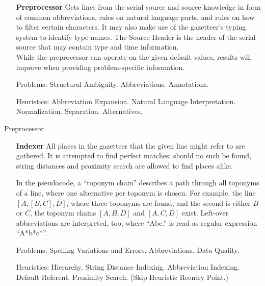 \documentclass[11pt]{article}
\begin{document}
\newpage

\begin{itemize}
\item[\textbf{Preprocessor}] Gets lines from the serial source and source knowledge in form of common abbreviations, rules on natural language parts, and rules on how to filter certain characters. It may also make use of the gazetteer's typing system to identify type names. The Source Header is the header of the serial source that may contain type and time information.\\
While the preprocessor can operate on the given default values, results will improve when providing problem-specific information.
\item[Problems:] Structural Ambiguity. Abbreviations. Annotations.
\item[Heuristics:] Abbreviation Expansion. Natural Language Interpretation. Normalization. Separation. Alternatives.
\end{itemize}

\begin{algorithm}[H]

\caption{Preprocessor}
\end{algorithm}

\newpage

\begin{itemize}
\item[\textbf{Indexer}] All places in the gazetteer that the given line might refer to are gathered. It is attempted to find perfect matches; should no such be found, string distances and proximity search are allowed to find places alike.

In the pseudocode, a ``toponym chain'' describes a path through all toponyms of a line, where one alternative per toponym is chosen. For example, the line $[A, [B,C], D]$, where three toponyms are found, and the second is either $B$ or $C$, the toponym chains $[A, B, D]$ and $[A, C, D]$ exist. Left-over abbreviations are interpreted, too, where ``Abc.'' is read as regular expression ``A*b*c*''.
\item[Problems:] Spelling Variations and Errors. Abbreviations. Data Quality.
\item[Heuristics:] Hierarchy. String Distance Indexing. Abbreviation Indexing. Default Referent. Proximity Search. (Skip Heuristic Reentry Point.)
\end{itemize}
\end{document}
